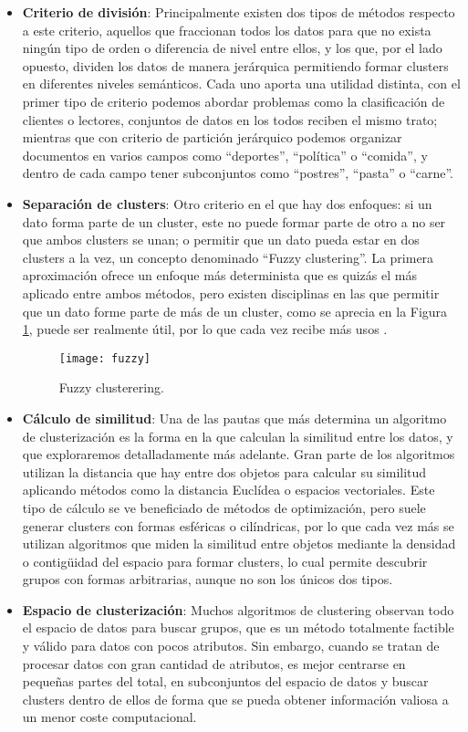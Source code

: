 \documentclass[10pt, a4paper]{article}
\begin{document}
\begin{itemize}
  \item \textbf{Criterio de división}: Principalmente existen dos tipos de métodos respecto a este criterio, aquellos que fraccionan todos los datos para que no exista ningún tipo de orden o diferencia de nivel entre ellos, y los que, por el lado opuesto, dividen los datos de manera jerárquica permitiendo formar clusters en diferentes niveles semánticos. Cada uno aporta una utilidad distinta, con el primer tipo de criterio podemos abordar problemas como la clasificación de clientes o lectores, conjuntos de datos en los todos reciben el mismo trato; mientras que con criterio de partición jerárquico podemos organizar documentos en varios campos como ``deportes'', ``política'' o ``comida'', y dentro de cada campo tener subconjuntos como ``postres'', ``pasta'' o ``carne''.
  
  \item \textbf{Separación de clusters}: Otro criterio en el que hay dos enfoques: si un dato forma parte de un cluster, este no puede formar parte de otro a no ser que ambos clusters se unan; o permitir que un dato pueda estar en dos clusters a la vez, un concepto denominado ``Fuzzy clustering''. La primera aproximación ofrece un enfoque más determinista que es quizás el más aplicado entre ambos métodos, pero existen disciplinas en las que permitir que un dato forme parte de más de un cluster, como se aprecia en la Figura \ref{fig:fuzzy}, puede ser realmente útil, por lo que cada vez recibe más usos \cite{17}. 
  
\begin{figure}[ht]
\centering
\texttt{[image: fuzzy]}
\caption{Fuzzy clusterering.}
\label{fig:fuzzy}
\end{figure}
  
  \item \textbf{Cálculo de similitud}: Una de las pautas que más determina un algoritmo de clusterización es la forma en la que calculan la similitud entre los datos, y que exploraremos detalladamente más adelante. Gran parte de los algoritmos utilizan la distancia que hay entre dos objetos para calcular su similitud aplicando métodos como la distancia Euclídea o espacios vectoriales. Este tipo de cálculo se ve beneficiado de métodos de optimización, pero suele generar clusters con formas esféricas o cilíndricas, por lo que cada vez más se utilizan algoritmos que miden la similitud entre objetos mediante la densidad o contigüidad del espacio para formar clusters, lo cual permite descubrir grupos con formas arbitrarias, aunque no son los únicos dos tipos.  
  
  \item \textbf{Espacio de clusterización}: Muchos algoritmos de clustering observan todo el espacio de datos para buscar grupos, que es un método totalmente factible y válido para datos con pocos atributos. Sin embargo, cuando se tratan de procesar datos con gran cantidad de atributos, es mejor centrarse en pequeñas partes del total, en subconjuntos del espacio de datos y buscar clusters dentro de ellos de forma que se pueda obtener información valiosa a un menor coste computacional.
\end{itemize}
\end{document}
